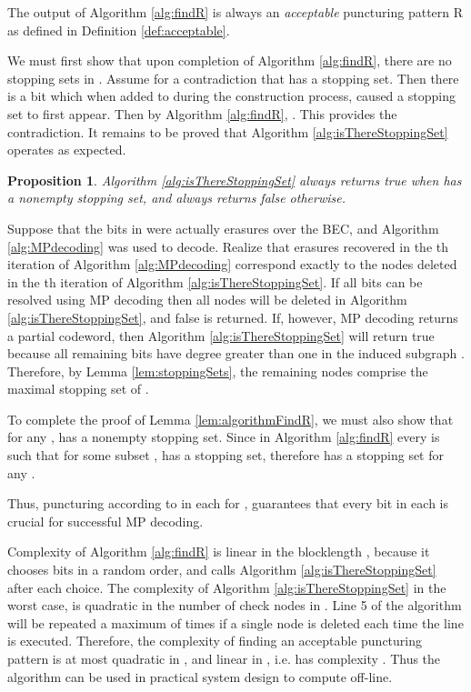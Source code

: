 \documentclass[10pt,twocolumn,twoside]{IEEEtran} \newlength{\pic}
\newtheorem{proposition}{Proposition}
\theoremstyle{definition}
\theoremstyle{remark}
\theoremstyle{plain}
\begin{document}
\begin{lemma}\label{lem:algorithmFindR}
 The output of Algorithm \ref{alg:findR} is always an \emph{acceptable} puncturing pattern R as defined in Definition \ref{def:acceptable}.
\end{lemma}
\begin{IEEEproof}
We must first show that upon completion of Algorithm \ref{alg:findR}, there are no stopping sets in . Assume for a contradiction that  has a stopping set. Then there is a bit  which when added to  during the construction process, caused a stopping set to first appear. Then by Algorithm \ref{alg:findR}, . This provides the contradiction. It remains to be proved that Algorithm \ref{alg:isThereStoppingSet} operates as expected.
\begin{proposition} \label{prop:algIsThereSSWorks}
 Algorithm \ref{alg:isThereStoppingSet} always returns true when  has a nonempty stopping set, and always returns false otherwise.
\end{proposition}
\begin{IEEEproof} Suppose that the bits in  were actually erasures over the BEC, and Algorithm \ref{alg:MPdecoding} was used to decode. Realize that erasures recovered in the th iteration of Algorithm \ref{alg:MPdecoding} correspond exactly to the nodes deleted in the th iteration of Algorithm \ref{alg:isThereStoppingSet}. If all bits can be resolved using MP decoding then all nodes will be deleted in Algorithm \ref{alg:isThereStoppingSet}, and false is returned. If, however, MP decoding returns a partial codeword, then Algorithm \ref{alg:isThereStoppingSet} will return true because all remaining bits have degree greater than one in the induced subgraph . Therefore, by Lemma \ref{lem:stoppingSets}, the remaining nodes comprise the maximal stopping set of .
\end{IEEEproof}

To complete the proof of Lemma \ref{lem:algorithmFindR}, we must also show that for any ,  has a nonempty stopping set. Since in Algorithm \ref{alg:findR} every  is such that for some subset ,  has a stopping set, therefore  has a stopping set for any .
\end{IEEEproof}
Thus, puncturing according to  in each  for , guarantees that every bit in each  is crucial for successful MP decoding.

Complexity of Algorithm \ref{alg:findR} is linear in the blocklength , because it chooses  bits in a random order, and calls Algorithm \ref{alg:isThereStoppingSet} after each choice. The complexity of Algorithm \ref{alg:isThereStoppingSet} in the worst case, is quadratic in  the number of check nodes in . Line 5 of the algorithm will be repeated a maximum of  times if a single node is deleted each time the line is executed. Therefore, the complexity of finding an acceptable puncturing pattern  is at most quadratic in , and linear in , i.e. has complexity . Thus the algorithm can be used in practical system design to compute  off-line.
\end{document}
